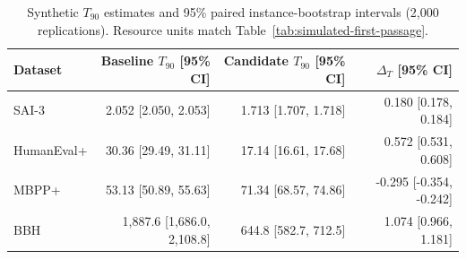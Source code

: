 \documentclass{article}
\theoremstyle{definition}
\theoremstyle{plain}
\theoremstyle{remark}
\begin{document}
\begin{table}[H]
\centering
\caption{Synthetic \(T_{90}\) estimates and 95\% paired instance-bootstrap
intervals (2,000 replications).  Resource units match
Table~\ref{tab:simulated-first-passage}.}
\label{tab:synthetic-quantile-ci}
\small
\begin{tabular}{lrrr}
\toprule
Dataset & Baseline \(T_{90}\) [95\% CI] & Candidate \(T_{90}\) [95\% CI]
& \(\Delta_T\) [95\% CI] \\
\midrule
SAI-3      & 2.052 [2.050, 2.053] & 1.713 [1.707, 1.718]
           & \phantom{-}0.180 [0.178, 0.184] \\
HumanEval+ & 30.36 [29.49, 31.11] & 17.14 [16.61, 17.68]
           & \phantom{-}0.572 [0.531, 0.608] \\
MBPP+      & 53.13 [50.89, 55.63] & 71.34 [68.57, 74.86]
           &          -0.295 [-0.354, -0.242] \\
BBH        & 1,887.6 [1,686.0, 2,108.8] & 644.8 [582.7, 712.5]
           & \phantom{-}1.074 [0.966, 1.181] \\
\bottomrule
\end{tabular}
\end{table}
\end{document}
